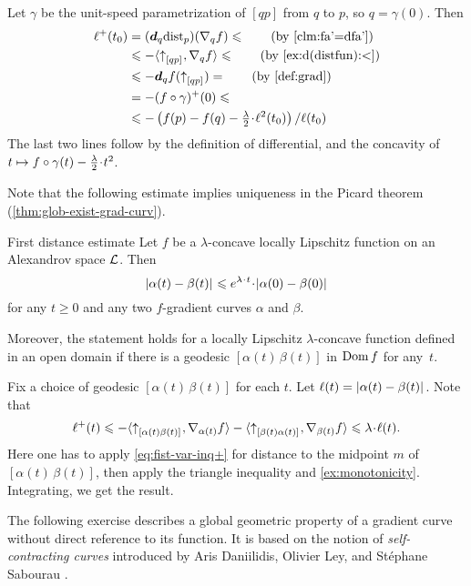 Let $\gamma$ be the unit-speed parametrization of $[qp]$ from $q$ to $p$, so $q=\gamma(0)$.
Then 
\begin{align*}
\ell^+(t_0)&=(\dd_q\distfun_p)(\nabla_qf)\le\tag{by \ref{clm:fa'=dfa'}}
\\
&\le -\langle\dir qp,\nabla_qf\rangle \le \tag{by \ref{ex:d(distfun):<}}
\\
&\le -\dd_qf(\dir qp)=\tag{by \ref{def:grad}}
\\
&=-(f\circ\gamma)^+(0)\le 
\\
&\le -\left({f(p)}-{f(q)}-\tfrac\lambda2\cdot\ell^2(t_0)\right)/\ell(t_0)
\end{align*}
The last two lines follow by
the definition of differential,
and the concavity of $t\z\mapsto f\circ\gamma(t)-\tfrac \lambda2\cdot {t^2}$.
\qeds

Note that the following estimate implies uniqueness in the Picard theorem (\ref{thm:glob-exist-grad-curv}).

\begin{thm}{First distance estimate}\label{thm:dist-est}
Let $f$ be a $\lambda$-concave locally Lipschitz function on an Alexandrov space $\mathcal{L}$.
Then
\[\dist{\alpha(t)}{\beta(t)}{}
\le 
e^{\lambda\cdot t}\cdot\dist[{{}}]{\alpha(0)}{\beta(0)}{}\]
for any $t\ge 0$ and any two $f$-gradient curves $\alpha$ and $\beta$.

Moreover, the statement holds for a locally Lipschitz $\lambda$-concave function defined in an open domain if there is a geodesic $[\alpha(t)\,\beta(t)]$ in $\mathop{\rm Dom}\nolimits f$ for any~$t$.
\end{thm}

Fix a choice of geodesic $[\alpha(t)\,\beta(t)]$ for each $t$.
Let $\ell(t)=|{\alpha(t)}-{\beta(t)}|_{}^{{}}$. 
Note that
\[\ell^+(t)
\le-
\<\dir{\alpha(t)}{\beta(t)},\nabla_{\alpha(t)}f\>-\<\dir{\beta(t)}{\alpha(t)},\nabla_{\beta(t)}f\>
\le
\lambda\cdot\ell(t).\]
Here one has to apply \ref{eq:fist-var-inq+} for distance to the midpoint $m$ of $[\alpha(t)\,\beta(t)]$, then apply the triangle inequality and \ref{ex:monotonicity}.
Integrating, we get the result.
\qeds



The following exercise describes a global geometric property of a gradient curve without direct reference to its function.
It is based on the notion of \emph{self-contracting curves} introduced by Aris Daniilidis, Olivier Ley, and Stéphane Sabourau \cite{daniilidis-ley-sabourau}.

